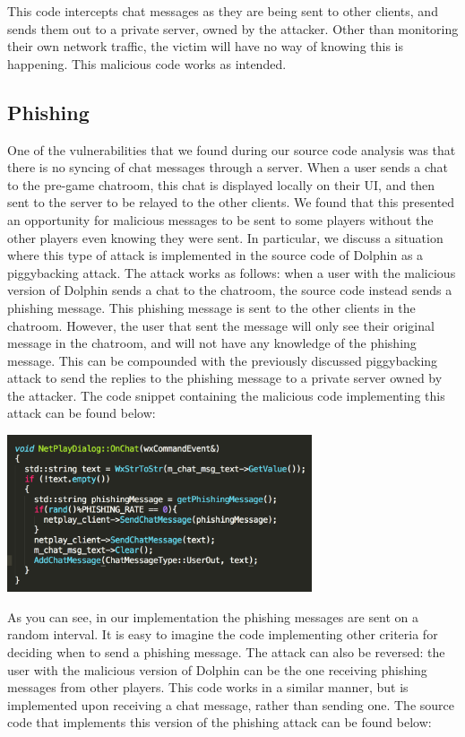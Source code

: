 \documentclass[conference]{IEEEtran}
\begin{document}
This code intercepts chat messages as they are being sent to other clients, and sends them out to a private server, owned by the attacker.
Other than monitoring their own network traffic, the victim will have no way of knowing this is happening.
This malicious code works as intended.
\subsection{Phishing}
One of the vulnerabilities that we found during our source code analysis was that there is no syncing of chat messages through a server.
When a user sends a chat to the pre-game chatroom, this chat is displayed locally on their UI, and then sent to the server to be relayed to the other clients.
We found that this presented an opportunity for malicious messages to be sent to some players without the other players even knowing they were sent.
In particular, we discuss a situation where this type of attack is implemented in the source code of Dolphin as a piggybacking attack.
The attack works as follows: when a user with the malicious version of Dolphin sends a chat to the chatroom, the source code instead sends a phishing message.
This phishing message is sent to the other clients in the chatroom.
However, the user that sent the message will only see their original message in the chatroom, and will not have any knowledge of the phishing message.
This can be compounded with the previously discussed piggybacking attack to send the replies to the phishing message to a private server owned by the attacker.
The code snippet containing the malicious code implementing this attack can be found below:
\vspace{0.5cm}
\begin{center}
\includegraphics[width=9cm]{Figures/Phishing1}
\end{center}
\vspace{0.5cm}

As you can see, in our implementation the phishing messages are sent on a random interval.
It is easy to imagine the code implementing other criteria for deciding when to send a phishing message.
The attack can also be reversed: the user with the malicious version of Dolphin can be the one receiving phishing messages from other players. 
This code works in a similar manner, but is implemented upon receiving a chat message, rather than sending one.
The source code that implements this version of the phishing attack can be found below:
\end{document}
